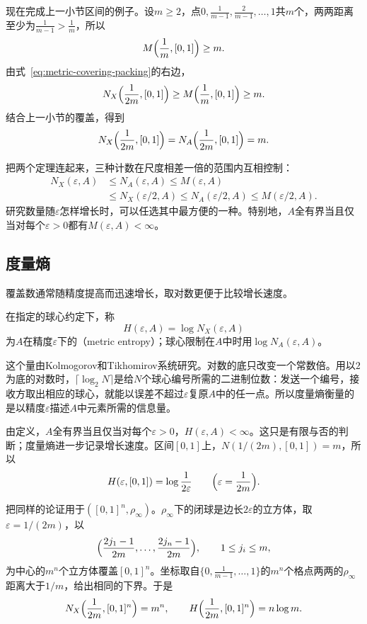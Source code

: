 现在完成上一小节区间的例子。设$m\geq2$，点$0,\tfrac1{m-1},\tfrac2{m-1},\ldots,1$共$m$个，两两距离至少为$\tfrac1{m-1}>\tfrac1m$，所以
\[
M\Bigl(\frac1m,[0,1]\Bigr)\geq m.
\]
由式~\eqref{eq:metric-covering-packing}的右边，
\[
N_X\Bigl(\frac1{2m},[0,1]\Bigr)\geq M\Bigl(\frac1m,[0,1]\Bigr)\geq m.
\]
结合上一小节的覆盖，得到
\[
N_X\Bigl(\frac1{2m},[0,1]\Bigr)=N_A\Bigl(\frac1{2m},[0,1]\Bigr)=m.
\]

把两个定理连起来，三种计数在尺度相差一倍的范围内互相控制：
\[
\begin{aligned}
N_X(\varepsilon,A)&\leq N_A(\varepsilon,A)\leq M(\varepsilon,A)\\
&\leq N_X(\varepsilon/2,A)\leq N_A(\varepsilon/2,A)\leq M(\varepsilon/2,A).
\end{aligned}
\]
研究数量随$\varepsilon$怎样增长时，可以任选其中最方便的一种。特别地，$A$全有界当且仅当对每个$\varepsilon>0$都有$M(\varepsilon,A)<\infty$。

\subsection{度量熵}
\label{sec:metric-entropy}

覆盖数通常随精度提高而迅速增长，取对数更便于比较增长速度。

\begin{definition}[度量熵]
\label{def:metric-entropy}
在指定的球心约定下，称
\begin{equation}
H(\varepsilon,A)=\log N_X(\varepsilon,A)
\label{eq:metric-entropy}
\end{equation}
为$A$在精度$\varepsilon$下的（metric entropy）；球心限制在$A$中时用$\log N_A(\varepsilon,A)$。
\end{definition}

这个量由Kolmogorov和Tikhomirov系统研究。对数的底只改变一个常数倍。用以$2$为底的对数时，$\lceil\log_2N\rceil$是给$N$个球心编号所需的二进制位数：发送一个编号，接收方取出相应的球心，就能以误差不超过$\varepsilon$复原$A$中的任一点。所以度量熵衡量的是以精度$\varepsilon$描述$A$中元素所需的信息量。

由定义，$A$全有界当且仅当对每个$\varepsilon>0$，$H(\varepsilon,A)<\infty$。这只是有限与否的判断；度量熵进一步记录增长速度。区间$[0,1]$上，$N(1/(2m),[0,1])=m$，所以
\[
H(\varepsilon,[0,1])=\log\frac1{2\varepsilon}\qquad\Bigl(\varepsilon=\frac1{2m}\Bigr).
\]

把同样的论证用于$([0,1]^n,\rho_\infty)$。$\rho_\infty$下的闭球是边长$2\varepsilon$的立方体，取$\varepsilon=1/(2m)$，以
\[
\Bigl(\frac{2j_1-1}{2m},\ldots,\frac{2j_n-1}{2m}\Bigr),\qquad1\leq j_i\leq m,
\]
为中心的$m^n$个立方体覆盖$[0,1]^n$。坐标取自$\{0,\tfrac1{m-1},\ldots,1\}$的$m^n$个格点两两的$\rho_\infty$距离大于$1/m$，给出相同的下界。于是
\[
N_X\Bigl(\frac1{2m},[0,1]^n\Bigr)=m^n,\qquad H\Bigl(\frac1{2m},[0,1]^n\Bigr)=n\log m.
\]

